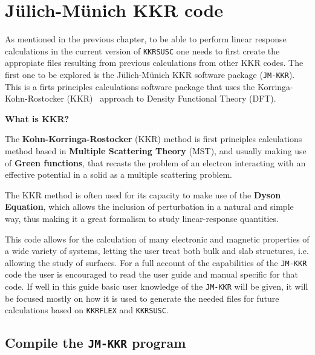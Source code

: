 \documentclass[11pt,fleqn]{book} %
\begin{document}
\chapter{J\"ulich-M\"unich KKR code}

As mentioned in the previous chapter, to be able to perform linear response calculations in the current version of \verb;KKRSUSC; one needs to first create the appropiate files resulting from previous calculations from other KKR codes. The first one to be explored is the J\"ulich-M\"unich KKR software package (\verb;JM-KKR;). This is a firts principles calculations software package that uses the Korringa-Kohn-Rostocker (KKR)~\cite{KKR} approach to Density Functional Theory (DFT). 

\begin{fBox}
{\Large{\textbf{\sffamily\textcolor{FZJTeal}{What is KKR?}}}}

The \textbf{Kohn-Korringa-Rostocker} (KKR) method is first principles calculations method based in \textbf{Multiple Scattering Theory} (MST), and usually making use of \textbf{Green functions}, that recasts the problem of an electron interacting with an effective potential in a solid as a multiple scattering problem. 

The KKR method is often used for its capacity to make use of the \textbf{Dyson Equation}, which allows the inclusion of perturbation in a natural and simple way, thus making it a great formalism to study linear-response quantities.
\end{fBox}

This code allows for the calculation of many electronic and magnetic properties of a wide variety of systems, letting the user treat both bulk and slab structures, i.e. allowing the study of surfaces. For a full account of the capabilities of the \verb;JM-KKR; code the user is encouraged to read the user guide and manual specific for that code. If well in this guide basic user knowledge of the \verb;JM-KKR; will be given, it will be focused mostly on how it is used to generate the needed files for future calculations based on \verb;KKRFLEX; and \verb;KKRSUSC;.

\section{Compile the \texttt{JM-KKR} program}
\label{sec:compile}
\end{document}
